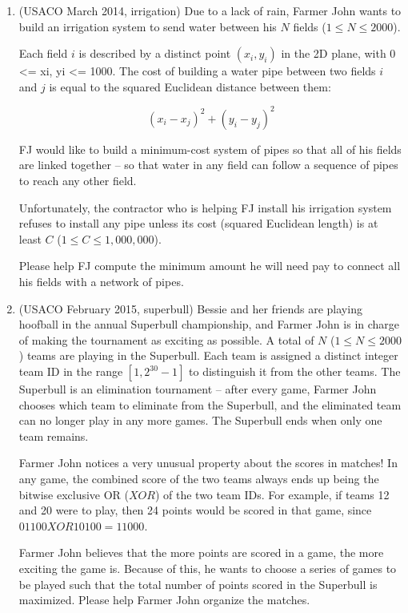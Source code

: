 \begin{enumerate}

\item
(USACO March 2014, irrigation)
Due to a lack of rain, Farmer John wants to build an irrigation system to
send water between his $N$ fields ($1 \le N \le 2000$).

Each field $i$ is described by a distinct point $(x_i, y_i)$ in the 2D plane,
with 0 <= xi, yi <= 1000.  The cost of building a water pipe between two
fields $i$ and $j$ is equal to the squared Euclidean distance between them: 

\[(x_i - x_j)^2 + (y_i - y_j)^2\]

FJ would like to build a minimum-cost system of pipes so that all of his
fields are linked together -- so that water in any field can follow a
sequence of pipes to reach any other field.  

Unfortunately, the contractor who is helping FJ install his irrigation
system refuses to install any pipe unless its cost (squared Euclidean
length) is at least $C$ ($1 \le C \le 1,000,000$).  

Please help FJ compute the minimum amount he will need pay to connect all
his fields with a network of pipes.

\item
(USACO February 2015, superbull)
Bessie and her friends are playing hoofball in the annual Superbull championship, and Farmer John is in charge of making the tournament as exciting as possible. A total of $N$ ($1 \le N \le 2000$) teams are playing in the Superbull. Each team is assigned a distinct integer team ID in the range $[1,2^{30}-1]$ to distinguish it from the other teams. The Superbull is an elimination tournament -- after every game, Farmer John chooses which team to eliminate from the Superbull, and the eliminated team can no longer play in any more games. The Superbull ends when only one team remains.

Farmer John notices a very unusual property about the scores in matches! In any game, the combined score of the two teams always ends up being the bitwise exclusive OR ($XOR$) of the two team IDs. For example, if teams 12 and 20 were to play, then 24 points would be scored in that game, since $01100 XOR 10100 = 11000$.

Farmer John believes that the more points are scored in a game, the more exciting the game is. Because of this, he wants to choose a series of games to be played such that the total number of points scored in the Superbull is maximized. Please help Farmer John organize the matches.

\end{enumerate}

